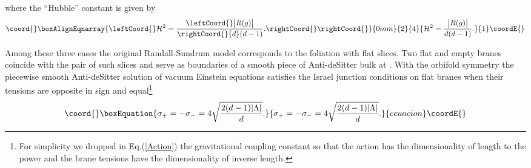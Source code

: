 \documentclass[a4paper,12pt]{article}
\providecommand{\p}{{+}}
\providecommand{\n}{{-}}
\providecommand{\ddim}{{d}}
\providecommand{\tens}{{\sigma}}
\begin{document}
where the ``Hubble'' constant \coordHE{} is given by
    \begin{eqnarray}\coord{}\boxAlignEqnarray{\leftCoord{}
     \mathcal{H}^2=\frac{\leftCoord{}\big|R(g)\big|}{\rightCoord{}\ddim(\ddim-1)}. \rightCoord{}
\rightCoord{}}{0mm}{2}{4}{
     \mathcal{H}^2=\frac{\big|R(g)\big|}{\ddim(\ddim-1)}. 
}{1}\coordE{}\end{eqnarray}


Among these three cases the original Randall-Sundrum model
\cite{RS} corresponds to the foliation with flat slices. Two flat
and empty branes coincide with the pair of such slices and serve
as boundaries of a smooth piece of Anti-deSitter bulk at \coordHE{}. With the orbifold symmetry the piecewise smooth
Anti-deSitter solution of vacuum Einstein equations satisfies the
Israel junction conditions on flat branes when their tensions are
opposite in sign and equal\footnote{For simplicity we dropped in
Eq.(\ref{Action}) the gravitational coupling constant so that the
action has the dimensionality of length to the power \coordHE{} and the
brane tensions have the dimensionality of inverse length.}
    \begin{equation}\coord{}\boxEquation{
     \tens_\p=-\tens_\n
     =4\sqrt{\frac{2(\ddim-1)
     |\Lambda|}{\ddim}}.\label{TensionsFlat}
    }{
     \tens_\p=-\tens_\n
     =4\sqrt{\frac{2(\ddim-1)
     |\Lambda|}{\ddim}}.}{ecuacion}\coordE{}\end{equation}
\end{document}
